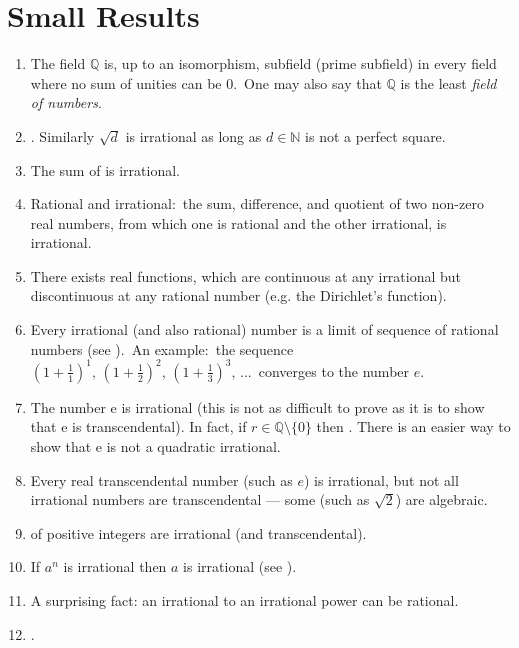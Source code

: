 \documentclass[12pt]{article}
\theoremstyle{definition}
\newcommand{\Nats}{\mathbb{N}}
\newcommand{\Rats}{\mathbb{Q}}
\begin{document}
\section{Small Results}

\begin{enumerate}

\item The field $\Rats$ is, up to an isomorphism, subfield (prime subfield) in  every field where no sum of unities can be 0. \,One may also say that $\Rats$ is the least {\em field of numbers}.

\item {}. Similarly $\sqrt{d}$ is irrational as long as $d\in \Nats$ is not a perfect square.

\item The sum of  is irrational.

\item Rational and irrational: \,the sum, difference,  and quotient of two non-zero real numbers, from which one is rational and the other irrational, is irrational.

\item There exists real functions, which are continuous at any irrational but discontinuous at any rational number (e.g. the Dirichlet's function).

\item Every irrational (and also rational) number is a limit of sequence of rational numbers (see ). \,An example: \,the sequence \,$(1+\frac{1}{1})^1,\, (1+\frac{1}{2})^2,\, (1+\frac{1}{3})^3,\, ...$\, converges to the number $e$.

\item The number e is irrational (this is not as difficult to prove as it is to show that e is transcendental). In fact, if $r\in \Rats \setminus \{0\}$ then . There is an easier way to show that e is not a quadratic irrational.

\item Every real transcendental number (such as $e$) is irrational, but not all irrational numbers are transcendental --- some (such as $\sqrt{2}$) are algebraic.

\item {} of positive integers are irrational (and transcendental).

\item If $a^n$ is irrational then $a$ is irrational (see ).

\item A surprising fact: an irrational to an irrational power can be rational.

\item {}.

\end{enumerate}
\end{document}
